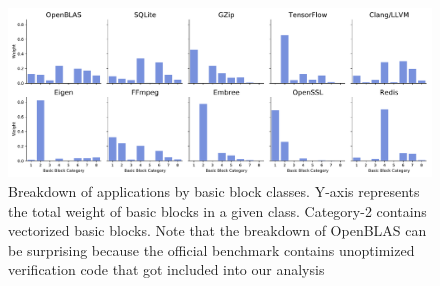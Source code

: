 \begin{figure}[h]
\includegraphics[width=\textwidth]{figures/apps-vs-clusters.pdf}
\caption{Breakdown of applications by basic block classes.
Y-axis represents the total weight of basic blocks
in a given class.
Category-2 contains vectorized basic blocks.
Note that the breakdown of OpenBLAS can be surprising
because the official benchmark contains
unoptimized verification code that got included into
our analysis}
\label{fig:apps_vs_clusters}
\end{figure}